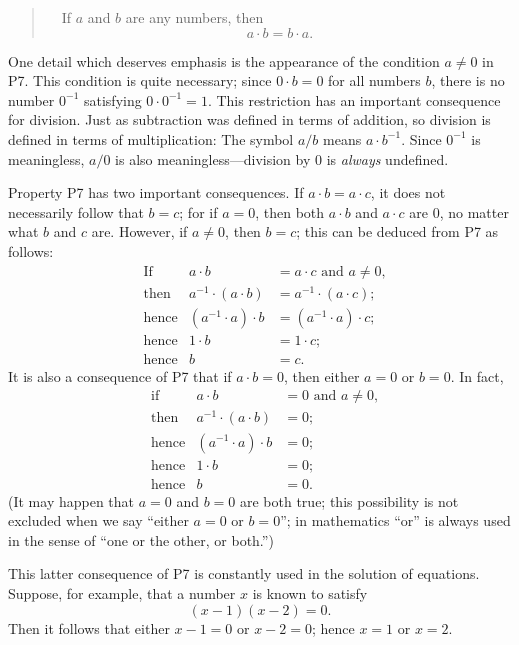 \begin{quote}
\ \ If $a$ and $b$ are any numbers, then
\[ a \cdot b = b \cdot a. \]
\end{quote}

One detail which deserves emphasis is the appearance of the condition
$a \neq 0$ in P7. This condition is quite necessary; since $0 \cdot b = 0$
for all numbers $b$, there is no number $0^{-1}$ satisfying
$0 \cdot 0^{-1} = 1$. This restriction has an important consequence for
division. Just as subtraction was defined in terms of addition, so division
is defined in terms of multiplication: The symbol $a/b$ means $a \cdot b^{-1}$.
Since $0^{-1}$ is meaningless, $a/0$ is also meaningless---division by $0$ is
\emph{always} undefined.

Property P7 has two important consequences. If $a \cdot b = a \cdot c$, it
does not necessarily follow that $b = c$; for if $a = 0$, then both
$a \cdot b$ and $a \cdot c$ are $0$, no matter what $b$ and $c$ are. However,
if $a \neq 0$, then $b = c$; this can be deduced from P7 as follows:
\begin{align*}
&\text{If} & a \cdot b &= a \cdot c \text{ and } a \neq 0,\\
&\text{then} & a^{-1} \cdot (a \cdot b) &= a^{-1} \cdot (a \cdot c);\\
&\text{hence} & (a^{-1} \cdot a) \cdot b &= (a^{-1} \cdot a) \cdot c;\\
&\text{hence} & 1 \cdot b &= 1 \cdot c;\\
&\text{hence} & b &= c.
\end{align*}
It is also a consequence of P7 that if $a \cdot b = 0$, then either $a = 0$ or
$b = 0$. In fact,
\begin{align*}
&\text{if} & a \cdot b &= 0 \text{ and } a \neq 0,\\
&\text{then} & a^{-1} \cdot (a \cdot b) &= 0;\\
&\text{hence} & (a^{-1} \cdot a) \cdot b &= 0;\\
&\text{hence} & 1 \cdot b &= 0;\\
&\text{hence} & b &= 0.
\end{align*}
(It may happen that $a = 0$ and $b = 0$ are both true; this possibility is
not excluded when we say ``either $a = 0$ or $b = 0$''; in mathematics ``or''
is always used in the sense of ``one or the other, or both.'')

This latter consequence of P7 is constantly used in the solution of
equations. Suppose, for example, that a number $x$ is known to satisfy
\[ (x-1)(x-2) = 0. \]
Then it follows that either $x-1=0$ or $x-2=0$; hence $x=1$ or $x=2$.

